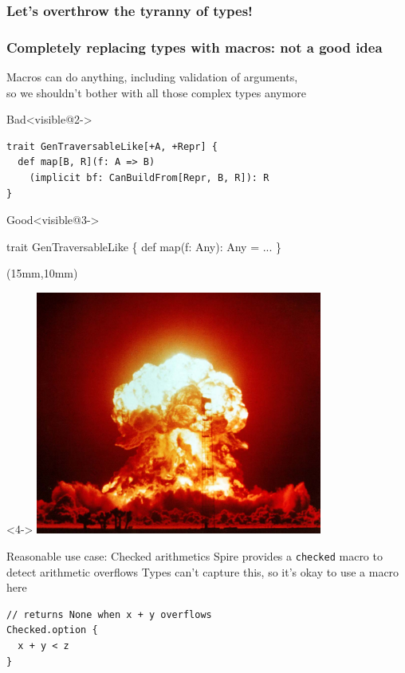 \documentclass[compress,xcolor={usenames,dvipsnames,table}]{beamer}
\begin{document}
\begin{frame}[fragile]
  \frametitle<1-3>{Let's overthrow the tyranny of types!}
  \frametitle<4>{Completely replacing types with macros: not a good idea}
  Macros can do anything, including validation of arguments,\\
  so we shouldn't bother with all those complex types anymore

  \vspace{1em}
  \begin{alertblock}{Bad}<visible@2->
    \begin{verbatim}
trait GenTraversableLike[+A, +Repr] {
  def map[B, R](f: A => B)
    (implicit bf: CanBuildFrom[Repr, B, R]): R
}
    \end{verbatim}
  \end{alertblock}
  \vskip-1cm

  \begin{exampleblock}{Good}<visible@3->
    \begin{semiverbatim}
trait GenTraversableLike \{
  def map(f: Any): Any = \text{\color{blue}{macro}} ...
\}
    \end{semiverbatim}
  \end{exampleblock}

  \begin{textblock*}{\textwidth}(15mm,10mm)
    \begin{visibleenv}<4->
      \includegraphics[height=8cm]{img/boom.jpg}
    \end{visibleenv}
  \end{textblock*}
\end{frame}

\begin{frame}[fragile]{Reasonable use case: Checked arithmetics}
  Spire provides a \texttt{checked} macro to detect arithmetic overflows
  Types can't capture this, so it's okay to use a macro here

  \vspace{1em}
  \begin{verbatim}
// returns None when x + y overflows
Checked.option {
  x + y < z
}
  \end{verbatim}
\end{frame}
\end{document}
